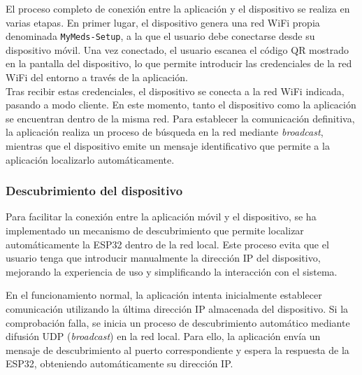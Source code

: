 El proceso completo de conexión entre la aplicación y el dispositivo se realiza en varias etapas. En primer lugar, el dispositivo genera una red WiFi propia denominada \texttt{MyMeds-Setup}, a la que el usuario debe conectarse desde su dispositivo móvil. Una vez conectado, el usuario escanea el código QR mostrado en la pantalla del dispositivo, lo que permite introducir las credenciales de la red WiFi del entorno a través de la aplicación.\\

Tras recibir estas credenciales, el dispositivo se conecta a la red WiFi indicada, pasando a modo cliente. En este momento, tanto el dispositivo como la aplicación se encuentran dentro de la misma red. Para establecer la comunicación definitiva, la aplicación realiza un proceso de búsqueda en la red mediante \textit{broadcast}, mientras que el dispositivo emite un mensaje identificativo que permite a la aplicación localizarlo automáticamente.

\subsubsection{Descubrimiento del dispositivo}
\label{sec:descubrimiento}

Para facilitar la conexión entre la aplicación móvil y el dispositivo, se ha implementado un mecanismo de descubrimiento que permite localizar automáticamente la ESP32 dentro de la red local. Este proceso evita que el usuario tenga que introducir manualmente la dirección IP del dispositivo, mejorando la experiencia de uso y simplificando la interacción con el sistema.

En el funcionamiento normal, la aplicación intenta inicialmente establecer comunicación utilizando la última dirección IP almacenada del dispositivo. Si la comprobación falla, se inicia un proceso de descubrimiento automático mediante difusión UDP (\textit{broadcast}) en la red local. Para ello, la aplicación envía un mensaje de descubrimiento al puerto correspondiente y espera la respuesta de la ESP32, obteniendo automáticamente su dirección IP.

